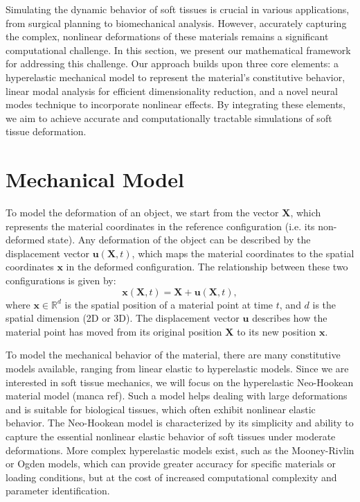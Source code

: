 \label{sec:problem_setting}

Simulating the dynamic behavior of soft tissues is crucial in various applications, from surgical planning to biomechanical analysis. However, accurately capturing the complex, nonlinear deformations of these materials remains a significant computational challenge. In this section, we present our mathematical framework for addressing this challenge. Our approach builds upon three core elements: a hyperelastic mechanical model to represent the material's constitutive behavior, linear modal analysis for efficient dimensionality reduction, and a novel neural modes technique to incorporate nonlinear effects. By integrating these elements, we aim to achieve accurate and computationally tractable simulations of soft tissue deformation.


\section{Mechanical Model}
\label{sec:mechanical_model}

To model the deformation of an object, we start from the vector \(\bm{X}\), which represents the material coordinates in the reference configuration (i.e. its non-deformed state). Any deformation of the object can be described by the displacement vector \(\bm{u}(\bm{X},t)\), which maps the material coordinates to the spatial coordinates \(\bm{x}\) in the deformed configuration. The relationship between these two configurations is given by:
\begin{equation}
    \bm{x}(\bm{X},t) = \bm{X} + \bm{u}(\bm{X},t),
\label{eq:deformation}
\end{equation}
where \(\bm{x} \in \mathbb{R}^d\) is the spatial position of a material point at time \(t\), and \(d\) is the spatial dimension (2D or 3D). The displacement vector \(\bm{u}\) describes how the material point has moved from its original position \(\bm{X}\) to its new position \(\bm{x}\).

To model the mechanical behavior of the material, there are many constitutive models available, ranging from linear elastic to hyperelastic models. Since we are interested in soft tissue mechanics, we will focus on the hyperelastic Neo-Hookean material model (manca ref). Such a model helps dealing with large deformations and is suitable for biological tissues, which often exhibit nonlinear elastic behavior. The Neo-Hookean model is characterized by its simplicity and ability to capture the essential nonlinear elastic behavior of soft tissues under moderate deformations. More complex hyperelastic models exist, such as the Mooney-Rivlin or Ogden models, which can provide greater accuracy for specific materials or loading conditions, but at the cost of increased computational complexity and parameter identification.

